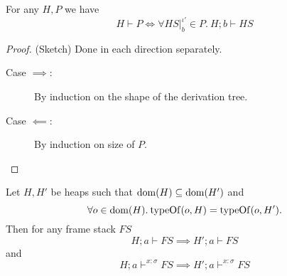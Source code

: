 \begin{proposition} \label{prop:2.13}
  For any $H, P$ we have 
  \begin{equation}
    H \vdash P \iff \forall HS|_b^{\iota'} \in P.\: H;b \vdash HS
  \end{equation}
\end{proposition}

\begin{proof} (Sketch) Done in each direction separately.
  \begin{description}
    \item[Case $\implies$:] By induction on the shape of the derivation tree.
    \item[Case $\impliedby$:] By induction on size of $P$.
  \end{description}
\end{proof}

\begin{proposition} \label{prop:2.14}
  Let $H, H'$ be heaps such that $\mbox{$\mathrm{dom}$}{(H)} \subseteq \mbox{$\mathrm{dom}$}{(H')}$ and 
  \begin{equation*}
    \forall o \in \mbox{$\mathrm{dom}$}{(H)}. \: \mbox{$\mathrm{typeOf}$}{(o, H)} = \mbox{$\mathrm{typeOf}$}{(o, H')}.
  \end{equation*}
  Then for any frame stack $FS$
  \begin{equation}\label{eq:fs_impl_typing1}
    H; a \vdash FS \implies H'; a \vdash FS
  \end{equation}
  and
  \begin{equation} \label{eq:fs_impl_typing2}
    H; a \vdash^{x :\sigma} FS \implies H'; a \vdash^{x: \sigma} FS 
  \end{equation}
\end{proposition}

